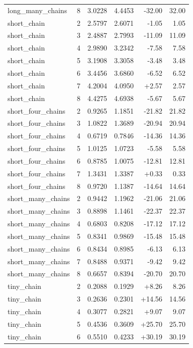 \begin{center}
\begin{longtable}{lrrrrr}
long\_many\_chains & 8 & 3.0228 & 4.4453 & -32.00 & 32.00 \\
short\_chain & 2 & 2.5797 & 2.6071 & -1.05 & 1.05 \\
short\_chain & 3 & 2.4887 & 2.7993 & -11.09 & 11.09 \\
short\_chain & 4 & 2.9890 & 3.2342 & -7.58 & 7.58 \\
short\_chain & 5 & 3.1908 & 3.3058 & -3.48 & 3.48 \\
short\_chain & 6 & 3.4456 & 3.6860 & -6.52 & 6.52 \\
short\_chain & 7 & 4.2004 & 4.0950 & +2.57 & 2.57 \\
short\_chain & 8 & 4.4275 & 4.6938 & -5.67 & 5.67 \\
short\_four\_chains & 2 & 0.9265 & 1.1851 & -21.82 & 21.82 \\
short\_four\_chains & 3 & 1.0822 & 1.3689 & -20.94 & 20.94 \\
short\_four\_chains & 4 & 0.6719 & 0.7846 & -14.36 & 14.36 \\
short\_four\_chains & 5 & 1.0125 & 1.0723 & -5.58 & 5.58 \\
short\_four\_chains & 6 & 0.8785 & 1.0075 & -12.81 & 12.81 \\
short\_four\_chains & 7 & 1.3431 & 1.3387 & +0.33 & 0.33 \\
short\_four\_chains & 8 & 0.9720 & 1.1387 & -14.64 & 14.64 \\
short\_many\_chains & 2 & 0.9442 & 1.1962 & -21.06 & 21.06 \\
short\_many\_chains & 3 & 0.8898 & 1.1461 & -22.37 & 22.37 \\
short\_many\_chains & 4 & 0.6803 & 0.8208 & -17.12 & 17.12 \\
short\_many\_chains & 5 & 0.8341 & 0.9869 & -15.48 & 15.48 \\
short\_many\_chains & 6 & 0.8434 & 0.8985 & -6.13 & 6.13 \\
short\_many\_chains & 7 & 0.8488 & 0.9371 & -9.42 & 9.42 \\
short\_many\_chains & 8 & 0.6657 & 0.8394 & -20.70 & 20.70 \\
tiny\_chain & 2 & 0.2088 & 0.1929 & +8.26 & 8.26 \\
tiny\_chain & 3 & 0.2636 & 0.2301 & +14.56 & 14.56 \\
tiny\_chain & 4 & 0.3077 & 0.2821 & +9.07 & 9.07 \\
tiny\_chain & 5 & 0.4536 & 0.3609 & +25.70 & 25.70 \\
tiny\_chain & 6 & 0.5510 & 0.4233 & +30.19 & 30.19 \\

\end{longtable}
\end{center}
